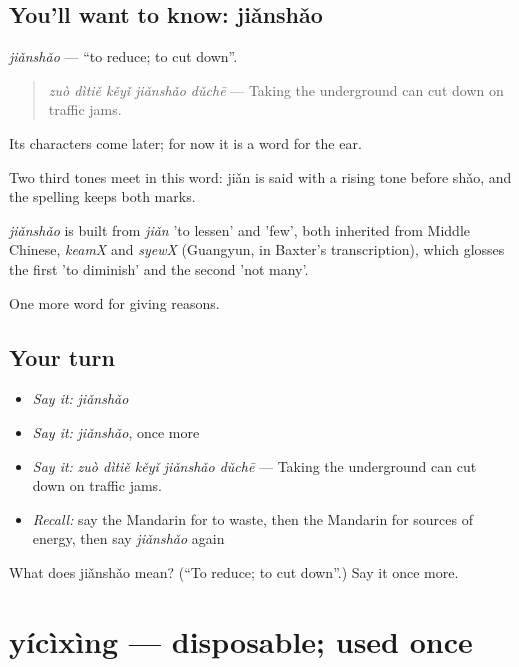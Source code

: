 \subsection*{You'll want to know: jiǎnshǎo}
\emph{jiǎnshǎo} — \textquotedblleft{}to reduce; to cut down\textquotedblright{}.

\begin{quote}
\emph{zuò dìtiě kěyǐ jiǎnshǎo dǔchē} — Taking the underground can cut down on traffic jams.
\end{quote}

Its characters come later; for now it is a word for the ear.

Two third tones meet in this word: jiǎn is said with a rising tone before shǎo, and the spelling keeps both marks.

\begin{cousinweb}
\emph{jiǎnshǎo} is built from \emph{jiǎn} 'to lessen' and  'few', both inherited from Middle Chinese, \emph{keamX} and \emph{syewX} (Guangyun, in Baxter's transcription), which glosses the first 'to diminish' and the second 'not many'.
\end{cousinweb}

\begin{grammarlens}[title={What you've built}]
One more word for giving reasons.
\end{grammarlens}

\subsection*{Your turn}
\begin{itemize}
\raggedright
  \item \emph{Say it:} \emph{jiǎnshǎo}
  \item \emph{Say it:} \emph{jiǎnshǎo}, once more
  \item \emph{Say it:} \emph{zuò dìtiě kěyǐ jiǎnshǎo dǔchē} — Taking the underground can cut down on traffic jams.
  \item \emph{Recall:} say the Mandarin for to waste, then the Mandarin for sources of energy, then say \emph{jiǎnshǎo} again
\end{itemize}

\begin{tcolorbox}[breakable,colback=teal!4,colframe=teal!35!black,title={Before you move on}]
What does jiǎnshǎo mean? (\textquotedblleft{}To reduce; to cut down\textquotedblright{}.) Say it once more.
\end{tcolorbox}
\section[yícìxìng]{yícìxìng — disposable; used once}

